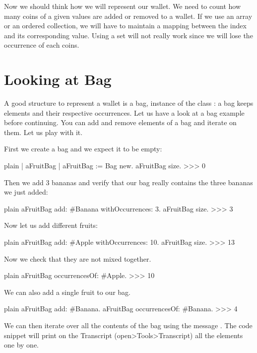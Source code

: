 \documentclass[10pt,twoside,english]{_support/latex/sbabook/sbabook}
\begin{document}
Now we should think how we will represent our wallet. We need to count how many coins of a given 
values are added or removed to a wallet. If we use an array or an ordered collection, we will have to maintain a mapping between the index and its corresponding value. Using a set will not really work since we will lose the occurrence of each coins.
\section{Looking at Bag}
A good structure to represent a wallet is a bag, instance of the class : a bag keeps elements and their respective occurrences. Let us have a look at a bag example before continuing.
 You can add and remove elements of a bag and iterate on them.  Let us play with it.

 First we create a bag and we expect it to be empty:

\begin{displaycode}{plain}
| aFruitBag |
aFruitBag := Bag new.
aFruitBag size.
>>> 0
\end{displaycode}

Then we add 3 bananas and verify that our bag really contains the three bananas we just added:

\begin{displaycode}{plain}
aFruitBag add: #Banana withOccurrences: 3.
aFruitBag size.
>>> 3
\end{displaycode}

Now let us add different fruits:

\begin{displaycode}{plain}
aFruitBag add: #Apple withOccurrences: 10. 
aFruitBag size.
>>> 13
\end{displaycode}

Now we check that they are not mixed together. 

\begin{displaycode}{plain}
aFruitBag occurrencesOf: #Apple.
>>> 10
\end{displaycode}

We can also add a single fruit to our bag.

\begin{displaycode}{plain}
aFruitBag add: #Banana.
aFruitBag occurrencesOf: #Banana.
>>> 4
\end{displaycode}

We can then iterate over all the contents of the bag using the message .
The code snippet will print on the Transcript (open\textgreater{}Tools\textgreater{}Transcript) all the elements one by one. 
\end{document}
